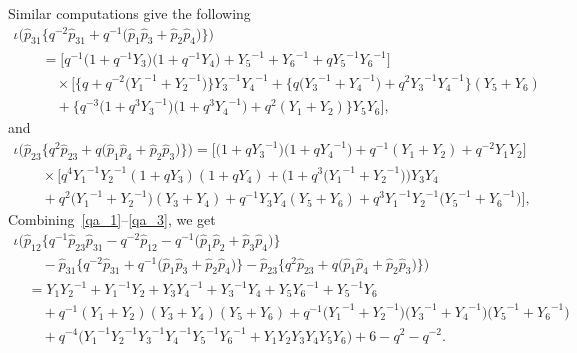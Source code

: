 \documentclass[pdftex]{sigma}
\numberwithin{equation}{section}
\begin{document}
Similar computations give the following
\begin{gather}
 \iota \big( \hat{p}_{31}\big\{ q^{-2} \hat{p}_{31} + q^{-1} \big( \hat{p}_1 \hat{p}_3 + \hat{p}_2 \hat{p}_4\big)\big\}\big)\nonumber \\
 \qquad{} = \big[ q^{-1} \big( 1 + q^{-1} Y_3\big)\big( 1 + q^{-1} Y_4\big) + {Y_5}^{-1} + {Y_6}^{-1} + q {Y_5}^{-1} {Y_6}^{-1}\big]\nonumber \\
 \qquad\quad{} \times \big[\big\{ q + q^{-2} \big( {Y_1}^{-1} + {Y_2}^{-1}\big)\big\} {Y_3}^{-1} {Y_4}^{-1} + \big\{ q\big( {Y_3}^{-1} + {Y_4}^{-1}\big) +q^2 {Y_3}^{-1} {Y_4}^{-1} \big\} ( Y_5 + Y_6 )\nonumber \\
\qquad\quad{} + \big\{ q^{-3}\big( 1 + q^3 {Y_3}^{-1}\big)\big( 1 + q^3 {Y_4}^{-1}\big) + q^2 ( Y_1 + Y_2 )\big\} Y_5 Y_6\big] , \label{qa_2}
\end{gather}
and
\begin{gather}
\iota\big( \hat{p}_{23}\big\{ q^2 \hat{p}_{23} + q\big( \hat{p}_1 \hat{p}_4 + \hat{p}_2 \hat{p}_3\big)\big\}\big) =
\big[ \big( 1 + q {Y_3}^{-1}\big)\big( 1 + q {Y_4}^{-1}\big) + q^{-1}( Y_1 + Y_2) + q^{-2} Y_1 Y_2\big]\nonumber \\
\qquad{} \times \big[ q^4 {Y_1}^{-1} {Y_2}^{-1} ( 1 + q Y_3 ) ( 1 + q Y_4 ) +\big( 1 + q^3\big( {Y_1}^{-1} + {Y_2}^{-1}\big)\big) Y_3 Y_4\nonumber \\
 \qquad{}+ q^2\big( {Y_1}^{-1} + {Y_2}^{-1}\big)( Y_3 + Y_4)+ q^{-1} Y_3 Y_4 ( Y_5 + Y_6 ) + q^3 {Y_1}^{-1} {Y_2}^{-1} \big( {Y_5}^{-1} + {Y_6}^{-1} \big)\big],\!\!\!\! \label{qa_3}
\end{gather}
Combining~\eqref{qa_1}--\eqref{qa_3}, we get
\begin{gather}
 \iota \big( \hat{p}_{12} \big\{ q^{-1} \hat{p}_{23} \hat{p}_{31} -q^{-2} \hat{p}_{12} - q^{-1} \big( \hat{p}_1 \hat{p}_2 + \hat{p}_3 \hat{p}_4\big) \big\}\nonumber \\
 \quad\quad{} - \hat{p}_{31} \big\{ q^{-2} \hat{p}_{31} + q^{-1} \big( \hat{p}_1 \hat{p}_3 + \hat{p}_2 \hat{p}_4 \big)\big\} - \hat{p}_{23} \big\{ q^2 \hat{p}_{23} + q \big( \hat{p}_1 \hat{p}_4 +
 \hat{p}_2 \hat{p}_3 \big) \big\} \big) \nonumber \\
 \quad{} = Y_1 {Y_2}^{-1} + {Y_1}^{-1} Y_2 + Y_3 {Y_4}^{-1} + {Y_3}^{-1} Y_4 + Y_5 {Y_6}^{-1} + {Y_5}^{-1} Y_6\nonumber \\
 \quad\quad {} + q^{-1} ( Y_1 + Y_2 ) ( Y_3 + Y_4)( Y_5 + Y_6) + q^{-1} \big( {Y_1}^{-1} + {Y_2}^{-1} \big) \big( {Y_3}^{-1} + {Y_4}^{-1}\big)\big( {Y_5}^{-1} + {Y_6}^{-1}\big)\nonumber \\
 \quad\quad {} + q^{-4} \big( {Y_1}^{-1} {Y_2}^{-1} {Y_3}^{-1} {Y_4}^{-1} {Y_5}^{-1} {Y_6}^{-1} + Y_1 Y_2 Y_3 Y_4 Y_5 Y_6\big) + 6 - q^2 - q^{-2} . \label{qa_4}
\end{gather}
\end{document}
